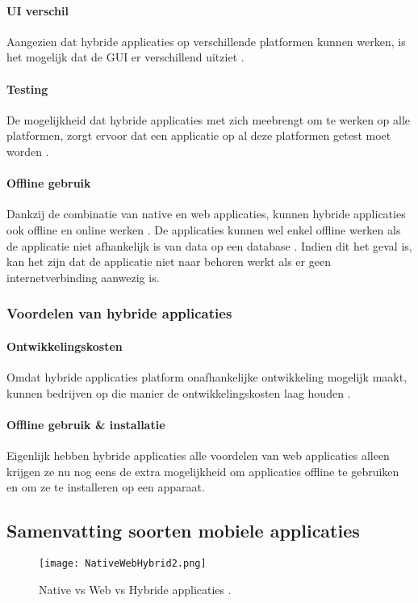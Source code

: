 \paragraph{UI verschil}
Aangezien dat hybride applicaties op verschillende platformen kunnen werken, is het 
mogelijk dat de GUI er verschillend uitziet \autocite{sgshradha2019}. 

\paragraph{Testing}
De mogelijkheid dat hybride applicaties met zich meebrengt om te werken op alle platformen, 
zorgt ervoor dat een applicatie op al deze platformen getest moet worden \autocite{sgshradha2019}.

\paragraph{Offline gebruik}
Dankzij de combinatie van native en web applicaties, kunnen hybride applicaties ook offline 
en online werken \autocite{Khan2021}. De applicaties kunnen wel enkel offline werken als de 
applicatie niet afhankelijk is van data op een database \autocite{sgshradha2019}. Indien 
dit het geval is, kan het zijn dat de applicatie niet naar behoren werkt als er geen 
internetverbinding aanwezig is.

\subsubsection{Voordelen van hybride applicaties}
\paragraph{Ontwikkelingskosten}
Omdat hybride applicaties platform onafhankelijke ontwikkeling mogelijk maakt, kunnen 
bedrijven op die manier de ontwikkelingskosten laag houden \autocite{Budiu2016}. 

\paragraph{Offline gebruik \& installatie}
Eigenlijk hebben hybride applicaties alle voordelen van web applicaties alleen krijgen ze 
nu nog eens de extra mogelijkheid om applicaties offline te gebruiken en om ze te 
installeren op een apparaat.

\subsection{Samenvatting soorten mobiele applicaties}
\begin{figure}[H]
    \centering
    \texttt{[image: NativeWebHybrid2.png]}
    \caption{Native vs Web vs Hybride applicaties \parencite{Merenych2021}.}
    \label{fig:NativeWebHybride}
\end{figure}

